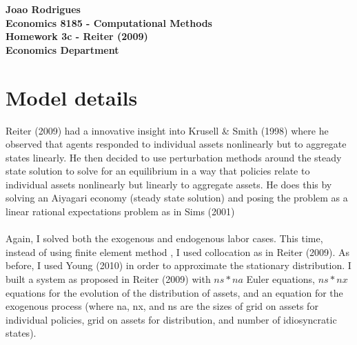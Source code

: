 \documentclass{article} %
\begin{document}
\begin{center}
  \textbf{Joao Rodrigues} \\
  \textbf{Economics 8185 - Computational Methods} \\
  \textbf{Homework 3c - Reiter (2009)} \\
  \textbf{Economics Department}
\end{center}
\section*{Model details}
Reiter (2009) had a innovative insight into Krusell \& Smith (1998) where he observed that agents responded to individual assets nonlinearly but to aggregate states linearly. He then decided to use perturbation methods around the steady state solution to solve for an equilibrium in a way that policies relate to individual assets nonlinearly but linearly to aggregate assets. He does this by solving an Aiyagari economy (steady state solution) and posing the problem as a linear rational expectations problem as in Sims (2001) \\
\\
Again, I solved both the exogenous and endogenous labor cases. This time, instead of using finite element method , I used collocation as in Reiter (2009). As before, I used Young (2010) in order to approximate the stationary distribution. I built a system as proposed in Reiter (2009) with $ns*na$ Euler equations, $ns*nx$ equations for the evolution of the distribution of assets, and an equation for the exogenous process (where na, nx, and ns are the sizes of grid on assets for individual policies, grid on assets for distribution, and number of idiosyncratic states). 
\end{document}
